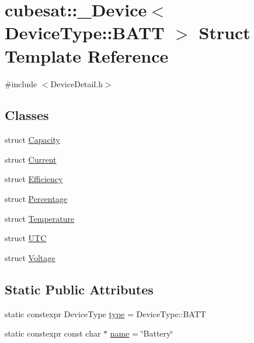 \hypertarget{structcubesat_1_1__Device_3_01DeviceType_1_1BATT_01_4}{}\section{cubesat\+:\+:\+\_\+\+Device$<$ Device\+Type\+:\+:B\+A\+TT $>$ Struct Template Reference}
\label{structcubesat_1_1__Device_3_01DeviceType_1_1BATT_01_4}


{\ttfamily \#include $<$Device\+Detail.\+h$>$}

\subsection*{Classes}
\begin{DoxyCompactItemize}
\item 
struct \hyperlink{structcubesat_1_1__Device_3_01DeviceType_1_1BATT_01_4_1_1Capacity}{Capacity}
\item 
struct \hyperlink{structcubesat_1_1__Device_3_01DeviceType_1_1BATT_01_4_1_1Current}{Current}
\item 
struct \hyperlink{structcubesat_1_1__Device_3_01DeviceType_1_1BATT_01_4_1_1Efficiency}{Efficiency}
\item 
struct \hyperlink{structcubesat_1_1__Device_3_01DeviceType_1_1BATT_01_4_1_1Percentage}{Percentage}
\item 
struct \hyperlink{structcubesat_1_1__Device_3_01DeviceType_1_1BATT_01_4_1_1Temperature}{Temperature}
\item 
struct \hyperlink{structcubesat_1_1__Device_3_01DeviceType_1_1BATT_01_4_1_1UTC}{U\+TC}
\item 
struct \hyperlink{structcubesat_1_1__Device_3_01DeviceType_1_1BATT_01_4_1_1Voltage}{Voltage}
\end{DoxyCompactItemize}
\subsection*{Static Public Attributes}
\begin{DoxyCompactItemize}
\item 
static constexpr Device\+Type \hyperlink{structcubesat_1_1__Device_3_01DeviceType_1_1BATT_01_4_a7ae61836978dd09725fad423b520021e}{type} = Device\+Type\+::\+B\+A\+TT
\item 
static constexpr const char $\ast$ \hyperlink{structcubesat_1_1__Device_3_01DeviceType_1_1BATT_01_4_a5faa38b56c60e03d8b60cb86746978fc}{name} = \char`\"{}Battery\char`\"{}
\end{DoxyCompactItemize}



